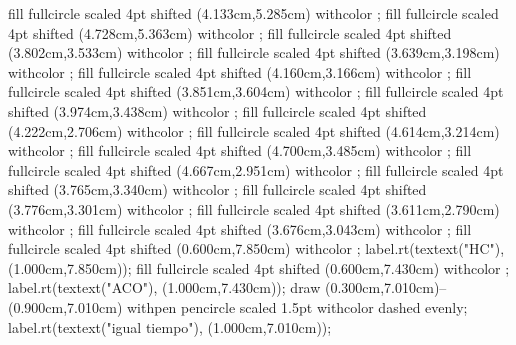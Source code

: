 {fill fullcircle scaled 4pt shifted (4.133cm,5.285cm) withcolor ;
fill fullcircle scaled 4pt shifted (4.728cm,5.363cm) withcolor ;
fill fullcircle scaled 4pt shifted (3.802cm,3.533cm) withcolor ;
fill fullcircle scaled 4pt shifted (3.639cm,3.198cm) withcolor ;
fill fullcircle scaled 4pt shifted (4.160cm,3.166cm) withcolor ;
fill fullcircle scaled 4pt shifted (3.851cm,3.604cm) withcolor ;
fill fullcircle scaled 4pt shifted (3.974cm,3.438cm) withcolor ;
fill fullcircle scaled 4pt shifted (4.222cm,2.706cm) withcolor ;
fill fullcircle scaled 4pt shifted (4.614cm,3.214cm) withcolor ;
fill fullcircle scaled 4pt shifted (4.700cm,3.485cm) withcolor ;
fill fullcircle scaled 4pt shifted (4.667cm,2.951cm) withcolor ;
fill fullcircle scaled 4pt shifted (3.765cm,3.340cm) withcolor ;
fill fullcircle scaled 4pt shifted (3.776cm,3.301cm) withcolor ;
fill fullcircle scaled 4pt shifted (3.611cm,2.790cm) withcolor ;
fill fullcircle scaled 4pt shifted (3.676cm,3.043cm) withcolor ;
fill fullcircle scaled 4pt shifted (0.600cm,7.850cm) withcolor ;
label.rt(textext("\tfx HC"), (1.000cm,7.850cm));
fill fullcircle scaled 4pt shifted (0.600cm,7.430cm) withcolor ;
label.rt(textext("\tfx ACO"), (1.000cm,7.430cm));
draw (0.300cm,7.010cm)--(0.900cm,7.010cm) withpen pencircle scaled 1.5pt withcolor  dashed evenly;
label.rt(textext("\tfx igual tiempo"), (1.000cm,7.010cm));
\stopMPcode}

